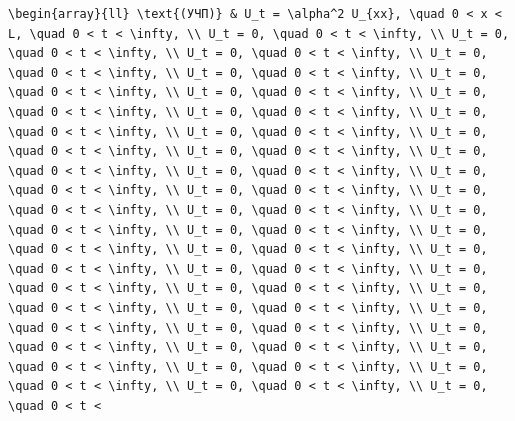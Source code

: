 \documentclass[
  ukrainian,
]{article}
\begin{document}
\begin{verbatim}
\begin{array}{ll} \text{(УЧП)} & U_t = \alpha^2 U_{xx}, \quad 0 < x < L, \quad 0 < t < \infty, \\ U_t = 0, \quad 0 < t < \infty, \\ U_t = 0, \quad 0 < t < \infty, \\ U_t = 0, \quad 0 < t < \infty, \\ U_t = 0, \quad 0 < t < \infty, \\ U_t = 0, \quad 0 < t < \infty, \\ U_t = 0, \quad 0 < t < \infty, \\ U_t = 0, \quad 0 < t < \infty, \\ U_t = 0, \quad 0 < t < \infty, \\ U_t = 0, \quad 0 < t < \infty, \\ U_t = 0, \quad 0 < t < \infty, \\ U_t = 0, \quad 0 < t < \infty, \\ U_t = 0, \quad 0 < t < \infty, \\ U_t = 0, \quad 0 < t < \infty, \\ U_t = 0, \quad 0 < t < \infty, \\ U_t = 0, \quad 0 < t < \infty, \\ U_t = 0, \quad 0 < t < \infty, \\ U_t = 0, \quad 0 < t < \infty, \\ U_t = 0, \quad 0 < t < \infty, \\ U_t = 0, \quad 0 < t < \infty, \\ U_t = 0, \quad 0 < t < \infty, \\ U_t = 0, \quad 0 < t < \infty, \\ U_t = 0, \quad 0 < t < \infty, \\ U_t = 0, \quad 0 < t < \infty, \\ U_t = 0, \quad 0 < t < \infty, \\ U_t = 0, \quad 0 < t < \infty, \\ U_t = 0, \quad 0 < t < \infty, \\ U_t = 0, \quad 0 < t < \infty, \\ U_t = 0, \quad 0 < t < \infty, \\ U_t = 0, \quad 0 < t < \infty, \\ U_t = 0, \quad 0 < t < \infty, \\ U_t = 0, \quad 0 < t < \infty, \\ U_t = 0, \quad 0 < t < \infty, \\ U_t = 0, \quad 0 < t < \infty, \\ U_t = 0, \quad 0 < t < \infty, \\ U_t = 0, \quad 0 < t < \infty, \\ U_t = 0, \quad 0 < t < \infty, \\ U_t = 0, \quad 0 < t < \infty, \\ U_t = 0, \quad 0 < t < 
\end{verbatim}
\end{document}
